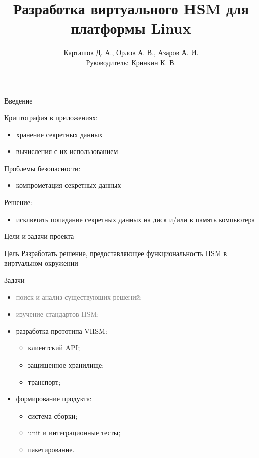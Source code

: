 \documentclass[utf8, 11pt]{beamer}
\author[ ]{Карташов Д. А., Орлов А. В., Азаров А. И. \\ Руководитель: Кринкин К. В.}
\title[Virtual HSM]{Разработка виртуального HSM для платформы Linux}
\institute[СПбАУ]
{
  Кафедра математических и информационных технологий\\
  Санкт-Петербургский Академический университет
}
\date{ }
\begin{document}
\begin{frame}
  \titlepage
\end{frame}

\begin{frame}{Введение}

Криптография в приложениях:
\begin{itemize}
\item хранение секретных данных
\item вычисления с их использованием
\end{itemize}

\vspace*{\fill}

Проблемы безопасности:
\begin{itemize}
\item компрометация секретных данных
\end{itemize}

\vspace*{\fill}

Решение:
\begin{itemize}
\item исключить попадание секретных данных на диск и/или в память компьютера
\end{itemize}

\vspace*{\fill}

\end{frame}

\begin{frame}{Цели и задачи проекта}

\begin{block}{Цель}
Разработать решение, предоставляющее функциональность HSM в виртуальном окружении
\end{block}

\vspace*{\fill}

\begin{block}{Задачи}
\begin{itemize}
\item \textcolor{gray}{поиск и анализ существующих решений;}
\item \textcolor{gray}{изучение стандартов HSM;}
\item разработка прототипа VHSM:
\begin{itemize}
	\item клиентский API;
	\item защищенное хранилище;
	\item транспорт;
\end{itemize}
\item формирование продукта:
\begin{itemize}
	\item система сборки;
	\item unit и интеграционные тесты;
	\item пакетирование.
\end{itemize}
\end{itemize}
\end{block}
\end{frame}
\end{document}
